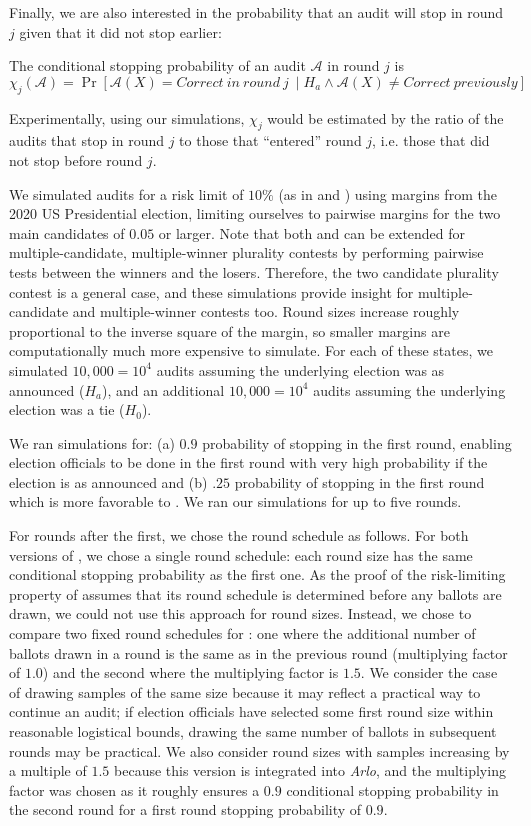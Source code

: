 Finally, we are also interested in the probability that an audit will stop in round $j$ given that it did not stop earlier: 
\begin{definition}
The conditional stopping probability  of an audit $\mathcal{A}$ in round $j$ is 
$$\chi_j (\mathcal{A})=\Pr[\mathcal{A}(X)=Correct ~in~round~j~\mid H_a \land \mathcal{A}(X) \neq Correct ~previously]$$
\end{definition}
Experimentally, using our simulations, $\chi_j$ would be estimated by the ratio of the audits that stop in round $j$ to those that ``entered'' round $j$, i.e. those that did not stop before round $j$. 

We simulated audits for a risk limit of $10\%$ (as in \cite{bravo} and \cite{usenix_minerva}) using margins from the 2020 US Presidential election, limiting ourselves to pairwise margins for the two main candidates of $0.05$ or larger. 
Note that both \BRAVO and \Minerva can be extended for multiple-candidate, multiple-winner plurality contests by performing pairwise tests between the winners and the losers\cite{RLA, arxiv_athena}. Therefore, the two candidate plurality contest is a general case, and these simulations provide insight for multiple-candidate and multiple-winner contests too.
Round sizes increase roughly proportional to the inverse
square of the margin, so 
smaller margins are computationally much more expensive to simulate.
For each of these states, we simulated 
$10,000=10^4$ audits assuming the underlying election was as announced ($H_a$),  
and an additional $10,000=10^4$ audits assuming the underlying election was a tie ($H_0$). 

We ran simulations for: (a) $0.9$ probability of stopping in the first round, enabling election officials to be done in the first round with very high probability if the election is as announced and (b) $.25$ probability of stopping in the first round which is more favorable to \BRAVO. We ran our simulations for up to five rounds. 

For rounds after the first, we chose the round schedule as follows. For both versions of \BRAVO, we chose a single round schedule: each round size has the same conditional stopping probability as the first one. As the proof of the risk-limiting property of \Minerva assumes that its round schedule is determined before any ballots are drawn, we could not use this approach for \Minerva round sizes. Instead, we chose to compare two fixed round schedules for \Minerva: one where the additional number of ballots drawn in a round is the same as in the previous round (multiplying factor of $1.0$) and the second where the multiplying factor is $1.5$. We consider the case of drawing samples of the same size because it may reflect a practical way to continue an
audit; if election officials have selected some first round size within
reasonable logistical bounds, drawing the same number of 
ballots in subsequent rounds may be practical.
We also consider round sizes with samples increasing by a multiple
of $1.5$ because this version is integrated into {\em Arlo}, and the multiplying factor was chosen as it roughly ensures a $0.9$ conditional stopping probability in the second round for a first round stopping probability of $0.9$. 

